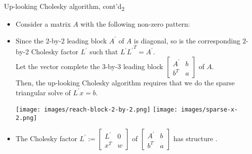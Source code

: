 \documentclass[t,usepdftitle=false]{beamer}
\begin{document}
\begin{frame}{Up-looking Cholesky algorithm, cont'd\textsubscript{2}}
\begin{itemize}
\vspace{-.5cm}
\item Consider a matrix $A$ with the following non-zero pattern:
\item Since the 2-by-2 leading block $A^\prime$ of $A$ is diagonal, so is the corresponding 2-by-2 Cholesky factor $L^\prime$ such that $L^\prime {L^\prime}^T=A^\prime$.\\
\vspace{.1cm}
Let the vector
complete the 3-by-3 leading block $\begin{bmatrix}A^\prime&b\\b^T&a\end{bmatrix}$ of $A$.\vspace{.1cm}\\
Then, the up-looking Cholesky algorithm requires that we do the sparse triangular solve of $L^\prime x=b$.\vspace{-.35cm}
\begin{center}
\hspace{1cm}
\texttt{[image: images/reach-block-2-by-2.png]}
\texttt{[image: images/sparse-x-2.png]}
\end{center}
\vspace{.05cm}
\item The Cholesky factor $L^\prime:=\begin{bmatrix}L^\prime&0\\x^T&w\end{bmatrix}$ of $\begin{bmatrix}A^\prime&b\\b^T&a\end{bmatrix}$  has structure .
\end{itemize}
\end{frame}
\end{document}
